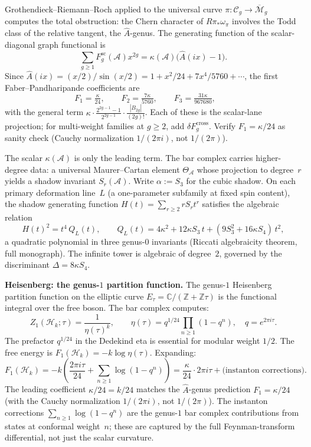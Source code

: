 \documentclass[11pt,reqno]{amsart}
\theoremstyle{definition}
\theoremstyle{remark}
\providecommand{\cA}{\mathcal{A}}
\providecommand{\cH}{\mathcal{H}}
\providecommand{\bC}{\mathbb{C}}
\providecommand{\bZ}{\mathbb{Z}}
\numberwithin{equation}{section}
\begin{document}
Grothendieck--Riemann--Roch applied to the universal curve
$\pi\colon\mathcal C_g\to\overline{\mathcal M}_g$ computes the total
obstruction: the Chern character of $R\pi_*\omega_\pi$ involves the
Todd class of the relative tangent, the $\hat A$-genus. The
generating function of the scalar-diagonal graph functional is
\[
\sum_{g\ge 1}F_g^{\mathrm{sc}}(\cA)x^{2g}
=\kappa(\cA)\bigl(\hat A(ix)-1\bigr).
\]
Since $\hat A(ix)=(x/2)/\sin(x/2)=1+x^2/24+7x^4/5760+\cdots$, the first
Faber--Pandharipande coefficients are
\[
F_1=\tfrac{\kappa}{24},\qquad F_2=\tfrac{7\kappa}{5760},\qquad F_3=\tfrac{31\kappa}{967680},
\qquad \]
with the general term
$\kappa\cdot\tfrac{2^{2g-1}-1}{2^{2g-1}}\cdot\tfrac{|B_{2g}|}{(2g)!}$.
Each of these is the scalar-lane projection; for multi-weight
families at $g\ge 2$, add $\delta F_g^{\mathrm{cross}}$. Verify
$F_1=\kappa/24$ as sanity check (Cauchy normalization
$1/(2\pi i)$, not $1/(2\pi)$).

The scalar $\kappa(\cA)$ is only the leading term. The bar complex
carries higher-degree data: a universal Maurer--Cartan element
$\Theta_\cA$ whose projection to degree~$r$ yields a shadow invariant
$S_r(\cA)$. Write $\alpha:=S_3$ for the cubic shadow.
On each primary deformation line~$L$ (a one-parameter subfamily
at fixed spin content), the shadow
generating function $H(t)=\sum_{r\ge 2}rS_rt^r$ satisfies the
algebraic relation
\begin{equation}\label{eq:preface-riccati-hook}
H(t)^2=t^4\,Q_L(t),\qquad Q_L(t)=4\kappa^2+12\kappa S_3\,t+(9S_3^2+16\kappa S_4)\,t^2,
\end{equation}
a quadratic polynomial in three genus-$0$ invariants
(Riccati algebraicity theorem, full monograph). The infinite tower is
algebraic of degree~$2$, governed by the discriminant
$\Delta=8\kappa S_4$.

\medskip
\noindent\textbf{Heisenberg: the genus-$1$ partition function.}\enspace
The genus-$1$ Heisenberg partition function on the elliptic curve
$E_\tau=\bC/(\bZ+\bZ\tau)$ is the functional integral over the
free boson. The bar complex computes:
\[
Z_1(\cH_k;\tau)=\frac{1}{\eta(\tau)^k},\qquad\eta(\tau)=q^{1/24}\prod_{n\ge 1}(1-q^n),\quad q=e^{2\pi i\tau}.
\]
The prefactor $q^{1/24}$ in the Dedekind eta is essential for
modular weight $1/2$. The free energy is
$F_1(\cH_k)=-k\log\eta(\tau)$. Expanding:
\[
F_1(\cH_k)=-k\left(\frac{2\pi i\tau}{24}+\sum_{n\ge 1}\log(1-q^n)\right)=\frac{\kappa}{24}\cdot 2\pi i\tau+\text{(instanton corrections)}.
\]
The leading coefficient $\kappa/24=k/24$ matches the $\hat A$-genus
prediction $F_1=\kappa/24$ (with the Cauchy normalization
$1/(2\pi i)$, not $1/(2\pi)$). The instanton corrections
$\sum_{n\ge 1}\log(1-q^n)$ are the genus-$1$ bar complex
contributions from states at conformal weight~$n$; these are
captured by the full Feynman-transform differential, not just the
scalar curvature.
\end{document}
